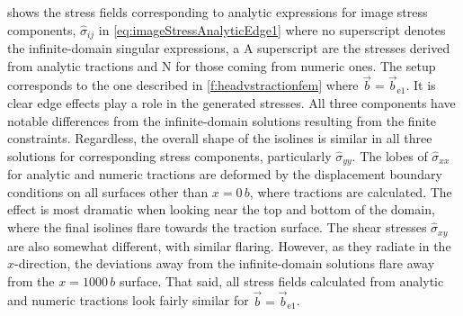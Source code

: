 \documentclass[11pt]{iopart}
\begin{document}
 shows the stress fields corresponding to analytic expressions for image stress components, $\hat{\sigma}_{ij}$ in \cref{eq:imageStressAnalyticEdge1} where no superscript denotes the infinite-domain singular expressions, a $\textrm{A}$ superscript are the stresses derived from analytic tractions and $\textrm{N}$ for those coming from numeric ones. The setup corresponds to the one described in \cref{f:headvstractionfem} where $\vec{b} = \vec{b}_{\textrm{e1}}$. It is clear edge effects play a role in the generated stresses. All three components have notable differences from the infinite-domain solutions resulting from the finite constraints. Regardless, the overall shape of the isolines is similar in all three solutions for corresponding stress components, particularly $\hat{\sigma}_{yy}$. The lobes of $\hat{\sigma}_{xx}$ for analytic and numeric tractions are deformed by the displacement boundary conditions on all surfaces other than $x = 0\, b$, where tractions are calculated. The effect is most dramatic when looking near the top and bottom of the domain, where the final isolines flare towards the traction surface. The shear stresses $\hat{\sigma}_{xy}$ are also somewhat different, with similar flaring. However, as they radiate in the $x$-direction, the deviations away from the infinite-domain solutions flare away from the $x = 1000\, b$ surface. That said, all stress fields calculated from analytic and numeric tractions look fairly similar for $\vec{b} = \vec{b}_{\textrm{e1}}$.
\end{document}
